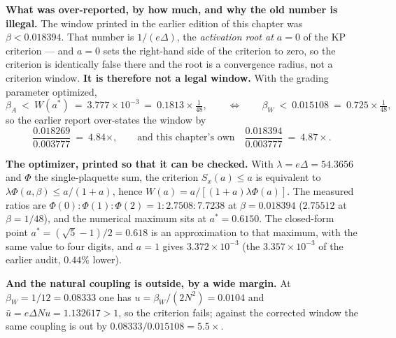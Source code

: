 \begin{warnbox}
\textbf{What was over-reported, by how much, and why the old number is illegal.} The window printed
in the earlier edition of this chapter was $\beta<0.018394$. That number is
$1/(e\Delta)$, the \emph{activation root at $a=0$} of the KP criterion --- and $a=0$ sets the
right-hand side of the criterion to zero, so the criterion is identically false there and the root
is a convergence radius, not a criterion window. \textbf{It is therefore not a legal window.} With
the grading parameter optimized,
\begin{equation}
\beta_A\ <\ W(a^\ast)\ =\ 3.777\times10^{-3}\ =\ 0.1813\times\tfrac1{48},
\qquad\Longleftrightarrow\qquad
\beta_W\ <\ 0.015108\ =\ 0.725\times\tfrac1{48},
\label{eq:est-window2}
\end{equation}
so the earlier report over-states the window by
\[
\frac{0.018269}{0.003777}\ =\ 4.84\times ,
\qquad\text{and this chapter's own}\quad
\frac{0.018394}{0.003777}\ =\ 4.87\times .
\]
\end{warnbox}

\noindent\textbf{The optimizer, printed so that it can be checked.} With $\lambda=e\Delta=54.3656$
and $\Phi$ the single-plaquette sum, the criterion $S_x(a)\le a$ is equivalent to
$\lambda\Phi(a,\beta)\le a/(1+a)$, hence $W(a)=a/[(1+a)\lambda\Phi(a)]$. The measured ratios are
$\Phi(0):\Phi(1):\Phi(2)=1:2.7508:7.7238$ at $\beta=0.018394$ ($2.75512$ at $\beta=1/48$), and the
numerical maximum sits at $a^\ast=0.6150$. The closed-form point $a^\ast=(\sqrt5-1)/2=0.618$ is an
approximation to that maximum, with the same value to four digits, and $a=1$ gives
$3.372\times10^{-3}$ (the $3.357\times10^{-3}$ of the earlier audit, $0.44\%$ lower).

\smallskip
\noindent\textbf{And the natural coupling is outside, by a wide margin.} At
$\beta_W=1/12=0.08333$ one has $u=\beta_W/(2N^2)=0.0104$ and $\bar u=e\Delta N u=1.132617>1$, so the
criterion fails; against the corrected window the same coupling is out by
$0.08333/0.015108=5.5\times$. 

